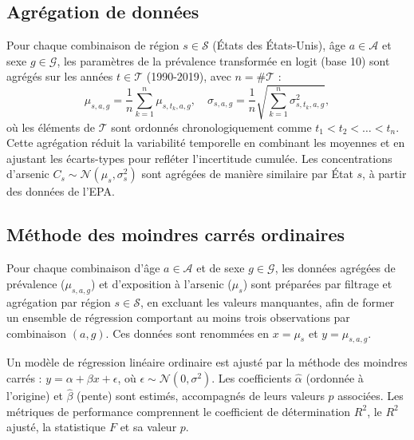 \subsection{Agrégation de données}
Pour chaque combinaison de région $s \in \mathcal{S}$ (États des États-Unis), âge $a \in \mathcal{A}$ et sexe $g \in \mathcal{G}$, les paramètres de la prévalence transformée en logit (base 10) sont agrégés sur les années $t \in \mathcal{T}$ (1990-2019), avec $n = \#\mathcal{T}$ :
\[
\mu_{s,a,g} = \frac{1}{n} \sum_{k=1}^n \mu_{s,t_k,a,g}, \quad \sigma_{s,a,g} = \frac{1}{n} \sqrt{\sum_{k=1}^n \sigma_{s,t_k,a,g}^2},
\]
où les éléments de $\mathcal{T}$ sont ordonnés chronologiquement comme $t_1 < t_2 < \dots < t_n$. Cette agrégation réduit la variabilité temporelle en combinant les moyennes et en ajustant les écarts-types pour refléter l'incertitude cumulée. Les concentrations d'arsenic $C_s \sim \mathcal{N}(\mu_s, \sigma_s^2)$ sont agrégées de manière similaire par État $s$, à partir des données de l'EPA.

\subsection{Méthode des moindres carrés ordinaires}
Pour chaque combinaison d'âge $a \in \mathcal{A}$ et de sexe $g \in \mathcal{G}$, les données agrégées de prévalence ($\mu_{s,a,g}$) et d'exposition à l'arsenic ($\mu_s$) sont préparées par filtrage et agrégation par région $s \in \mathcal{S}$, en excluant les valeurs manquantes, afin de former un ensemble de régression comportant au moins trois observations par combinaison $(a, g)$. Ces données sont renommées en $x = \mu_s$ et $y = \mu_{s,a,g}$.

Un modèle de régression linéaire ordinaire est ajusté par la méthode des moindres carrés : $y = \alpha + \beta x + \epsilon$, où $\epsilon \sim \mathcal{N}(0, \sigma^2)$. Les coefficients $\hat{\alpha}$ (ordonnée à l'origine) et $\hat{\beta}$ (pente) sont estimés, accompagnés de leurs valeurs $p$ associées. Les métriques de performance comprennent le coefficient de détermination $R^2$, le $R^2$ ajusté, la statistique $F$ et sa valeur $p$.

